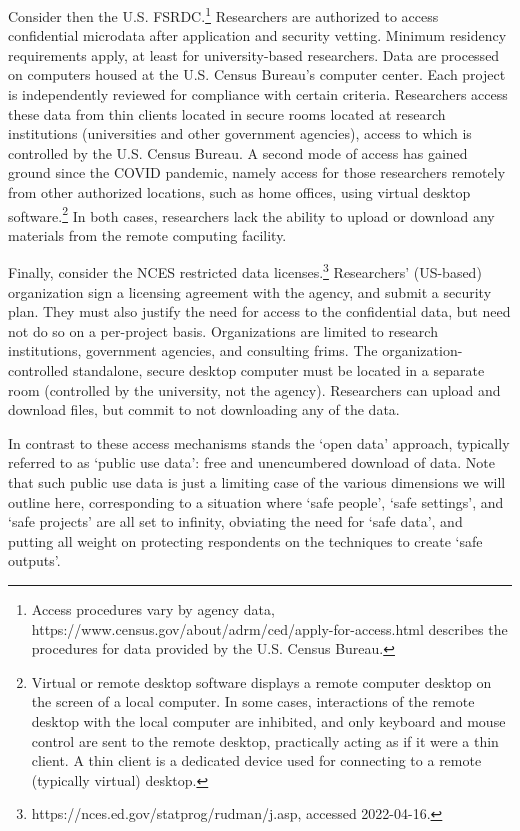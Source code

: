 Consider then the U.S. \ac{FSRDC}.\footnote{Access procedures vary by agency data, https://www.census.gov/about/adrm/ced/apply-for-access.html describes the procedures for data provided by the U.S. Census Bureau.} Researchers are authorized to access confidential microdata after application and security vetting. Minimum residency requirements apply, at least for university-based researchers. Data are processed on computers housed at the U.S. Census Bureau's computer center. Each project is independently reviewed for compliance with certain criteria. Researchers access these data from thin clients located in secure rooms located at research institutions (universities and other government agencies), access to which is controlled by the U.S. Census Bureau. A second mode of access has gained ground since the COVID pandemic, namely access for those researchers remotely from other authorized locations, such as home offices, using virtual desktop software.\footnote{Virtual or remote desktop software displays a remote computer desktop on the screen of a local computer. In some cases, interactions of the remote desktop with the local computer are inhibited, and only keyboard and mouse control are sent to the remote desktop, practically acting as if it were a thin client.  A thin client is a dedicated device used for connecting to a remote (typically virtual) desktop.} In both cases, researchers lack the ability to upload or download any materials from the remote computing facility. 

Finally, consider the \ac{NCES} restricted data licenses.\footnote{https://nces.ed.gov/statprog/rudman/j.asp, accessed 2022-04-16.} Researchers' (US-based) organization sign a licensing agreement with the agency, and submit a security plan. They must also justify the need for access to the confidential data, but need not do so on a per-project basis. Organizations are limited to research institutions, government agencies, and consulting frims. The organization-controlled standalone, secure desktop computer must be located in a separate room (controlled by the university, not the agency). Researchers can upload and download files, but commit to not downloading any of the data. 

In contrast to these access mechanisms stands the `open data' approach, typically referred to as `public use data': free and unencumbered download of data. Note that such public use data is just a limiting case of the various dimensions we will outline here, corresponding to a situation where `safe people', `safe settings', and `safe projects' are all set to infinity, obviating the need for `safe data', and putting all weight on protecting respondents on the techniques to create `safe outputs'. 

